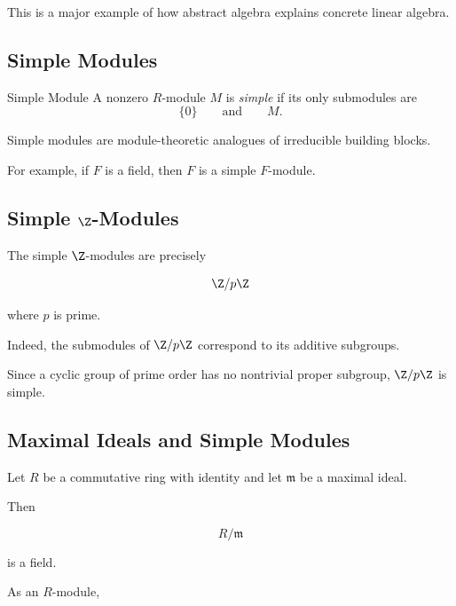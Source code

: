 This is a major example of how abstract algebra explains concrete linear
algebra.

\subsection{Simple Modules}
\label{subsec:simple-modules}

\begin{definitionbox}{Simple Module}
A nonzero \(R\)-module \(M\) is \emph{simple} if its only submodules are
\[ \{0\}\qquad\text{and}\qquad M. \]
\end{definitionbox}

Simple modules are module-theoretic analogues of irreducible building blocks.

For example, if \(F\) is a field, then \(F\) is a simple \(F\)-module.

\subsection{Simple \(\Z\)-Modules}
\label{subsec:simple-z-modules}

The simple \(\Z\)-modules are precisely

\[ \Z/p\Z \]

where \(p\) is prime.

Indeed, the submodules of \(\Z/p\Z\) correspond to its additive subgroups.

Since a cyclic group of prime order has no nontrivial proper subgroup,
\(\Z/p\Z\) is simple.

\subsection{Maximal Ideals and Simple Modules}
\label{subsec:maximal-ideals-simple-modules}

Let \(R\) be a commutative ring with identity and let
\(\mathfrak m\) be a maximal ideal.

Then

\[ R/\mathfrak m \]

is a field.

As an \(R\)-module,

